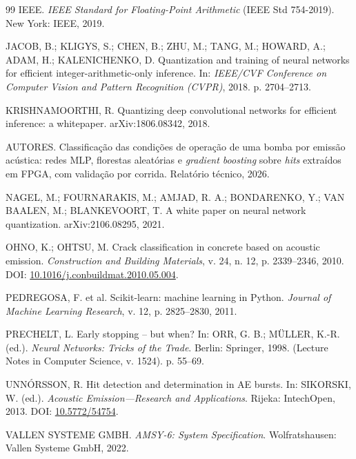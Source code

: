 \documentclass[12pt]{article}
\begin{document}
\begin{thebibliography}{99}
	IEEE.
	\newblock \emph{IEEE Standard for Floating-Point Arithmetic} (IEEE Std 754-2019).
	\newblock New York: IEEE, 2019.

	JACOB, B.; KLIGYS, S.; CHEN, B.; ZHU, M.; TANG, M.; HOWARD, A.; ADAM, H.; KALENICHENKO, D.
	\newblock Quantization and training of neural networks for efficient integer-arithmetic-only inference.
	\newblock In: \emph{IEEE/CVF Conference on Computer Vision and Pattern Recognition (CVPR)}, 2018. p. 2704--2713.

	KRISHNAMOORTHI, R.
	\newblock Quantizing deep convolutional networks for efficient inference: a whitepaper.
	\newblock arXiv:1806.08342, 2018.

	AUTORES.
	\newblock Classificação das condições de operação de uma bomba por emissão acústica: redes MLP, florestas aleatórias e \textit{gradient boosting} sobre \textit{hits} extraídos em FPGA, com validação por corrida.
	\newblock Relatório técnico, 2026.

	NAGEL, M.; FOURNARAKIS, M.; AMJAD, R. A.; BONDARENKO, Y.; VAN BAALEN, M.; BLANKEVOORT, T.
	\newblock A white paper on neural network quantization.
	\newblock arXiv:2106.08295, 2021.

	OHNO, K.; OHTSU, M.
	\newblock Crack classification in concrete based on acoustic emission.
	\newblock \emph{Construction and Building Materials}, v. 24, n. 12, p. 2339--2346, 2010.
	\newblock DOI: \href{https://doi.org/10.1016/j.conbuildmat.2010.05.004}{10.1016/j.conbuildmat.2010.05.004}.

	PEDREGOSA, F. et al.
	\newblock Scikit-learn: machine learning in Python.
	\newblock \emph{Journal of Machine Learning Research}, v. 12, p. 2825--2830, 2011.

	PRECHELT, L.
	\newblock Early stopping -- but when?
	\newblock In: ORR, G. B.; MÜLLER, K.-R. (ed.). \emph{Neural Networks: Tricks of the Trade}.
	\newblock Berlin: Springer, 1998. (Lecture Notes in Computer Science, v. 1524). p. 55--69.

	UNN{\TH}{\'O}RSSON, R.
	\newblock Hit detection and determination in AE bursts.
	\newblock In: SIKORSKI, W. (ed.). \emph{Acoustic Emission---Research and Applications}.
	\newblock Rijeka: IntechOpen, 2013.
	\newblock DOI: \href{https://doi.org/10.5772/54754}{10.5772/54754}.

	VALLEN SYSTEME GMBH.
	\newblock \emph{AMSY-6: System Specification}.
	\newblock Wolfratshausen: Vallen Systeme GmbH, 2022.

\end{thebibliography}
\end{document}
